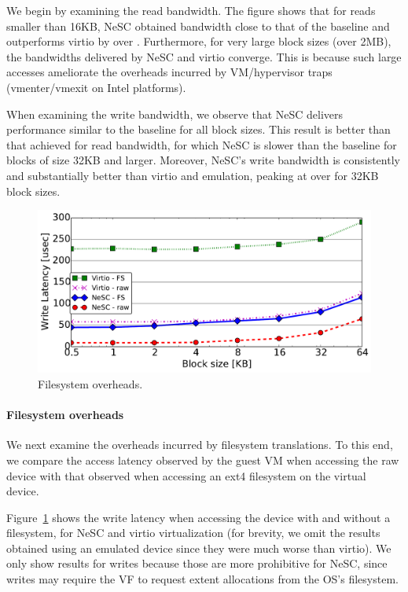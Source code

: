 We begin by examining the read bandwidth.
%
The figure shows that for reads smaller than 16KB, NeSC obtained bandwidth close to that of the baseline and outperforms virtio by over .
%
Furthermore, for very large block sizes (over 2MB), the bandwidths delivered by NeSC and virtio converge. This is because such large accesses ameliorate the overheads incurred by VM/hypervisor traps (vmenter/vmexit on Intel platforms).

When examining the write bandwidth, we observe that NeSC delivers performance similar to the baseline for all block sizes. This result is better than that achieved for read bandwidth, for which NeSC is \tilde{} slower than  the baseline for blocks of size 32KB and larger. Moreover, NeSC's write bandwidth is consistently and substantially better than virtio and emulation, peaking at over  for 32KB block sizes.


\begin{figure}[t]
  \centering
  \includegraphics[width=1\columnwidth]{figs/fs_affect.pdf}
  \caption{Filesystem overheads.}
  \label{fig:fs_effect}
\end{figure}

\paragraph{Filesystem overheads}
We next examine the overheads incurred by filesystem translations. To this end, we compare the access latency observed by the guest VM when accessing the raw device with that observed when accessing an ext4 filesystem on the virtual device.

Figure~\ref{fig:fs_effect} shows the write latency when accessing the device with and without a filesystem, for NeSC and virtio virtualization (for brevity, we omit the results obtained using an emulated device since they were much worse than virtio). We only show results for writes because those are more prohibitive for NeSC, since writes may require the VF to request extent allocations from the OS's filesystem.

